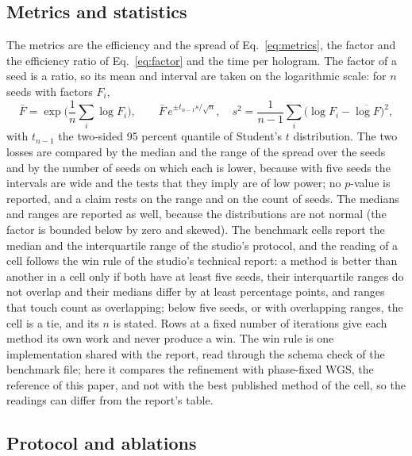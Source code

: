 \subsection{Metrics and statistics}

The metrics are the efficiency and the spread of Eq.~\ref{eq:metrics}, the factor and the efficiency ratio of Eq.~\ref{eq:factor} and the time per hologram. The factor of a seed is a ratio, so its mean and interval are
taken on the logarithmic scale: for $n$ seeds with factors $F_i$,
\begin{equation}
\bar F=\exp\Big(\frac1n\sum_i\log F_i\Big),\qquad \bar F\,e^{\pm t_{n-1}s/\sqrt n},\quad s^2=\frac1{n-1}\sum_i\big(\log F_i-\overline{\log F}\big)^2,\label{eq:geomean}
\end{equation}
with $t_{n-1}$ the two-sided 95 percent quantile of Student's $t$ distribution. The two losses are compared by the median and the range of the spread over the seeds and by the number of seeds on which each is lower, because with five seeds the intervals are wide and the tests that they imply are of low power; no $p$-value is reported, and a claim rests on the range and on the count of seeds. The medians and ranges are
reported as well, because the distributions are not normal (the factor is bounded below by zero and skewed). The benchmark cells report the median and the interquartile range of the studio's protocol, and the reading of a cell follows the win rule of the studio's technical report: a method is better than another in a cell only if both have at least five seeds, their interquartile ranges do not overlap and their medians differ by at least \benchOneWinMinDiff{} percentage points, and ranges that touch count as overlapping; below five seeds, or with overlapping ranges, the cell is a tie, and its $n$ is stated. Rows at a fixed number of iterations give each method its own work and never produce a win. The win rule is one implementation shared with the report, read through the schema check of the benchmark file; here it compares the refinement with phase-fixed WGS, the reference of this paper, and not with the best published method of the cell, so the readings can differ from the report's table.

\subsection{Protocol and ablations}

